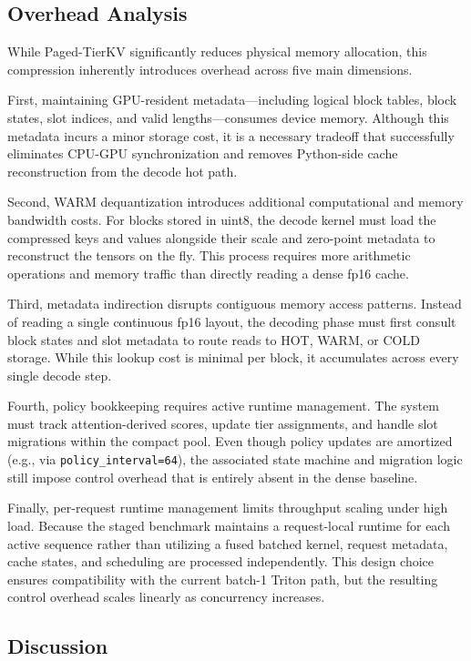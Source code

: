 \documentclass{article}
\begin{document}
\subsection{Overhead Analysis}

While Paged-TierKV significantly reduces physical memory allocation, this compression inherently introduces overhead across five main dimensions.

First, maintaining GPU-resident metadata---including logical block tables, block states, slot indices, and valid lengths---consumes device memory. Although this metadata incurs a minor storage cost, it is a necessary tradeoff that successfully eliminates CPU-GPU synchronization and removes Python-side cache reconstruction from the decode hot path.

Second, WARM dequantization introduces additional computational and memory bandwidth costs. For blocks stored in uint8, the decode kernel must load the compressed keys and values alongside their scale and zero-point metadata to reconstruct the tensors on the fly. This process requires more arithmetic operations and memory traffic than directly reading a dense fp16 cache.

Third, metadata indirection disrupts contiguous memory access patterns. Instead of reading a single continuous fp16 layout, the decoding phase must first consult block states and slot metadata to route reads to HOT, WARM, or COLD storage. While this lookup cost is minimal per block, it accumulates across every single decode step.

Fourth, policy bookkeeping requires active runtime management. The system must track attention-derived scores, update tier assignments, and handle slot migrations within the compact pool. Even though policy updates are amortized (e.g., via \texttt{policy\_interval=64}), the associated state machine and migration logic still impose control overhead that is entirely absent in the dense baseline.

Finally, per-request runtime management limits throughput scaling under high load. Because the staged benchmark maintains a request-local runtime for each active sequence rather than utilizing a fused batched kernel, request metadata, cache states, and scheduling are processed independently. This design choice ensures compatibility with the current batch-1 Triton path, but the resulting control overhead scales linearly as concurrency increases.

\subsection{Discussion}
\end{document}
